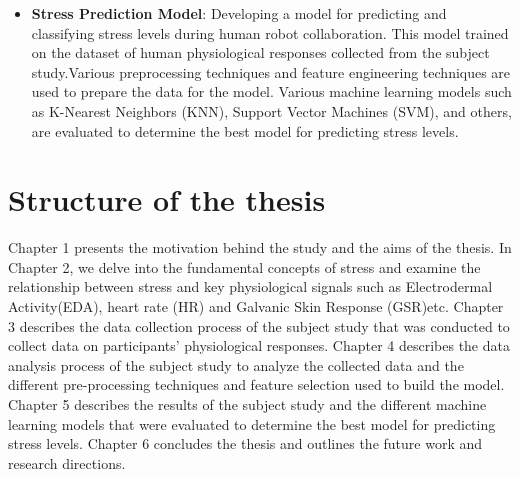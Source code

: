 \begin{itemize}
	\item \textbf{Stress Prediction Model}: Developing a model for predicting and classifying stress levels during human robot collaboration. This model  trained on the dataset of human physiological responses collected from the subject study.Various preprocessing techniques and feature engineering techniques are used to prepare the data for the model.
	Various machine learning models such as K-Nearest Neighbors (KNN), Support Vector Machines (SVM), and others, are evaluated to determine the best model for predicting stress levels.
  \end{itemize}


  \section{Structure of the thesis}
  Chapter 1 presents the motivation behind the study and the aims of the thesis. In Chapter 2, we delve into the fundamental concepts of stress and examine the relationship between stress and key physiological signals such as Electrodermal Activity(EDA), heart rate (HR) and Galvanic Skin Response (GSR)etc. Chapter 3 describes the data collection process of the subject study that was conducted to collect data on participants' physiological responses. Chapter 4 describes the data analysis process of the subject study  to analyze the collected data and the different pre-processing techniques and feature selection used to build the model. Chapter 5 describes the results of the subject study and the different machine learning models that were evaluated to determine the best model for predicting stress levels. Chapter 6 concludes the thesis and outlines the future work and research directions.
  

  
 
 